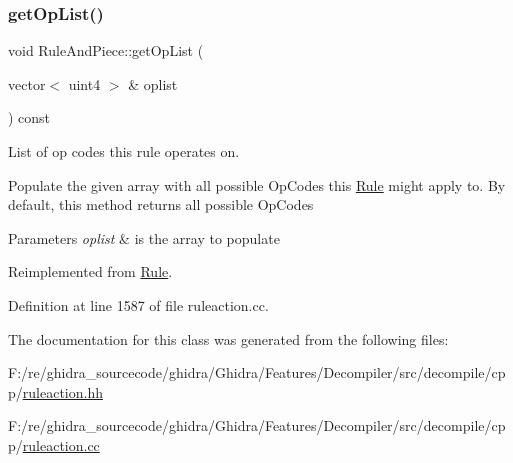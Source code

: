 \subsubsection{\texorpdfstring{getOpList()}{getOpList()}}
{\footnotesize\ttfamily void Rule\+And\+Piece\+::get\+Op\+List (\begin{DoxyParamCaption}\item[{vector$<$ uint4 $>$ \&}]{oplist }\end{DoxyParamCaption}) const\hspace{0.3cm}{\ttfamily [virtual]}}



List of op codes this rule operates on. 

Populate the given array with all possible Op\+Codes this \mbox{\hyperlink{class_rule}{Rule}} might apply to. By default, this method returns all possible Op\+Codes 
\begin{DoxyParams}{Parameters}
{\em oplist} & is the array to populate \\
\hline
\end{DoxyParams}


Reimplemented from \mbox{\hyperlink{class_rule_a4023bfc7825de0ab866790551856d10e}{Rule}}.



Definition at line 1587 of file ruleaction.\+cc.



The documentation for this class was generated from the following files\+:\begin{DoxyCompactItemize}
\item 
F\+:/re/ghidra\+\_\+sourcecode/ghidra/\+Ghidra/\+Features/\+Decompiler/src/decompile/cpp/\mbox{\hyperlink{ruleaction_8hh}{ruleaction.\+hh}}\item 
F\+:/re/ghidra\+\_\+sourcecode/ghidra/\+Ghidra/\+Features/\+Decompiler/src/decompile/cpp/\mbox{\hyperlink{ruleaction_8cc}{ruleaction.\+cc}}\end{DoxyCompactItemize}

